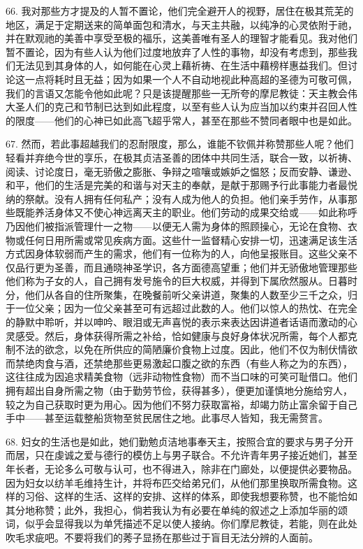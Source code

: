 66. 我对那些方才提及的人暂不置论，他们完全避开人的视野，居住在极其荒芜的地区，满足于定期送来的简单面包和清水，与天主共融，以纯净的心灵依附于祂，并在默观祂的美善中享受至极的福乐，这美善唯有圣人的理智才能看见。我对他们暂不置论，因为有些人认为他们过度地放弃了人性的事物，却没有考虑到，那些我们无法见到其身体的人，如何能在心灵上藉祈祷、在生活中藉榜样惠益我们。但讨论这一点将耗时且无益；因为如果一个人不自动地视此种高超的圣德为可敬可佩，我们的言语又怎能令他如此呢？只是该提醒那些一无所夸的摩尼教徒：天主教会伟大圣人们的克己和节制已达到如此程度，以至有些人认为应当加以约束并召回人性的限度——他们的心神已如此高飞超乎常人，甚至在那些不赞同者眼中也是如此。\par

67. 然而，若此事超越我们的忍耐限度，那么，谁能不钦佩并称赞那些人呢？他们轻看并弃绝今世的享乐，在极其贞洁圣善的团体中共同生活，联合一致，以祈祷、阅读、讨论度日，毫无骄傲之膨胀、争辩之喧嚷或嫉妒之愠怒；反而安静、谦逊、和平，他们的生活是完美的和谐与对天主的奉献，是献于那赐予行此事能力者最悦纳的祭献。没有人拥有任何私产；没有人成为他人的负担。他们亲手劳作，从事那些既能养活身体又不使心神远离天主的职业。他们劳动的成果交给或——如此称呼乃因他们被指派管理什一之物——以便无人需为身体的照顾操心，无论在食物、衣物或任何日用所需或常见疾病方面。这些什一监督精心安排一切，迅速满足该生活方式因身体软弱而产生的需求，他们有一位称为的人，向他呈报账目。这些父亲不仅品行更为圣善，而且通晓神圣学识，各方面德高望重；他们并无骄傲地管理那些他们称为子女的人，自己拥有发号施令的巨大权威，并得到下属欣然服从。日暮时分，他们从各自的住所聚集，在晚餐前听父亲讲道，聚集的人数至少三千之众，归于一位父亲；因为一位父亲甚至可有远超过此数的人。他们以惊人的热忱、在完全的静默中聆听，并以呻吟、眼泪或无声喜悦的表示来表达因讲道者话语而激动的心灵感受。然后，身体获得所需之补给，恰如健康与良好身体状况所需，每个人都克制不法的欲念，以免在所供应的简陋廉价食物上过度。因此，他们不仅为制伏情欲而禁绝肉食与酒，还禁绝那些更易激起口腹之欲的东西（有些人称之为的东西），这往往成为因追求精美食物（远非动物性食物）而不当口味的可笑可耻借口。他们拥有超出自身所需之物（由于勤劳节俭，获得甚多），便更加谨慎地分施给穷人，较之为自己获取时更为用心。因为他们不努力获取富裕，却竭力防止富余留于自己手中——甚至运载整船货物至贫民居住之地。此事尽人皆知，我无需赘言。\par

68. 妇女的生活也是如此，她们勤勉贞洁地事奉天主，按照合宜的要求与男子分开而居，只在虔诚之爱与德行的模仿上与男子联合。不允许青年男子接近她们，甚至年长者，无论多么可敬与认可，也不得进入，除非在门廊处，以便提供必要物品。因为妇女以纺羊毛维持生计，并将布匹交给弟兄们，从他们那里换取所需食物。这样的习俗、这样的生活、这样的安排、这样的体系，即使我想要称赞，也不能恰如其分地称赞；此外，我担心，倘若我认为有必要在单纯的叙述之上添加华丽的颂词，似乎会显得我以为单凭描述不足以使人接纳。你们摩尼教徒，若能，则在此处吹毛求疵吧。不要将我们的莠子显扬在那些过于盲目无法分辨的人面前。\par

